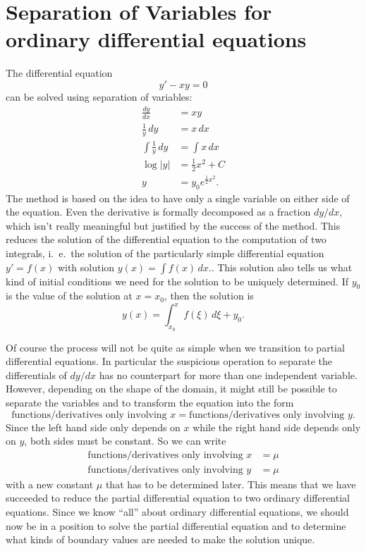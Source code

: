 %
%
%
\section{Separation of Variables for ordinary differential equations}
The differential equation
\begin{equation}
y'-xy=0
\label{separation:ode}
\end{equation}
can be solved using separation of variables:
\begin{align*}
\frac{dy}{dx}&=xy\\
\frac1y\,dy&=x\,dx\\
\int\frac1y\,dy&=\int x\,dx\\
\log|y|&=\frac12x^2+C\\
y&=y_0e^{\frac12x^2}.
\end{align*}
The method is based on the idea to have only a single variable
on either side of the equation.
Even the derivative is formally decomposed as a fraction $dy/dx$, which
isn't really meaningful but justified by the success of the method.
This reduces the solution of the differential equation to the computation
of two integrals, i.~e.~the solution of the particularly simple
differential equation $y'=f(x)$ with solution $y(x)=\int f(x)\,dx$..
This solution also tells us what kind of initial conditions we need
for the solution to be uniquely determined.
If $y_0$ is the value of the solution at $x=x_0$, then the solution is
\[
y(x)=\int_{x_0}^xf(\xi)\,d\xi + y_0.
\]

Of course the process will not be quite as simple when we transition
to partial differential equations.
In particular the suspicious operation to separate the differentials
of $dy/dx$ has no counterpart for more than one independent variable.
However, depending on the shape of the domain, it might still be possible
to separate the variables and to transform the equation into the form
\[
\text{functions/derivatives only involving $x$}
=
\text{functions/derivatives only involving $y$}.
\]
Since the left hand side only depends on $x$ while the right hand side
depends only on $y$, both sides must be constant.
So we can write
\begin{align*}
\text{functions/derivatives only involving $x$} &= \mu
\\
\text{functions/derivatives only involving $y$} &= \mu
\end{align*}
with a new constant $\mu$ that has to be determined later.
This means that we have succeeded to reduce the partial differential
equation to two ordinary differential equations.
Since we know ``all'' about ordinary differential equations, we should
now be in a position to solve the partial differential equation and
to determine what kinds of boundary values are needed to make the
solution unique.

